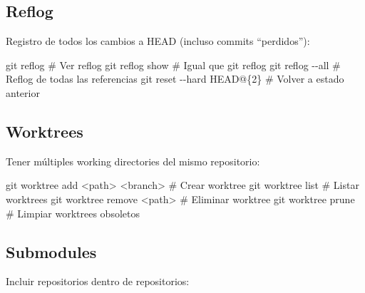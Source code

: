 \documentclass[
  doc,
  floatsintext,
  longtable,
  a4paper,
  nolmodern,
  notxfonts,
  notimes,
  12pt,
  colorlinks=true,linkcolor=blue,citecolor=blue,urlcolor=blue]{apa7}
\newenvironment{Shaded}{\begin{snugshade}}{\end{snugshade}}
\newcommand{\AttributeTok}[1]{\textcolor[rgb]{0.40,0.45,0.13}{#1}}
\newcommand{\CommentTok}[1]{\textcolor[rgb]{0.37,0.37,0.37}{#1}}
\newcommand{\FunctionTok}[1]{\textcolor[rgb]{0.28,0.35,0.67}{#1}}
\newcommand{\NormalTok}[1]{\textcolor[rgb]{0.00,0.23,0.31}{#1}}
\newcommand{\OperatorTok}[1]{\textcolor[rgb]{0.37,0.37,0.37}{#1}}
\begin{document}
\subsection{Reflog}\label{reflog}

Registro de todos los cambios a HEAD (incluso commits ``perdidos''):

\begin{Shaded}
\begin{Highlighting}[]
\FunctionTok{git}\NormalTok{ reflog                 }\CommentTok{\# Ver reflog}
\FunctionTok{git}\NormalTok{ reflog show            }\CommentTok{\# Igual que git reflog}
\FunctionTok{git}\NormalTok{ reflog }\AttributeTok{{-}{-}all}           \CommentTok{\# Reflog de todas las referencias}
\FunctionTok{git}\NormalTok{ reset }\AttributeTok{{-}{-}hard}\NormalTok{ HEAD@\{2\}  }\CommentTok{\# Volver a estado anterior}
\end{Highlighting}
\end{Shaded}

\subsection{Worktrees}\label{worktrees}

Tener múltiples working directories del mismo repositorio:

\begin{Shaded}
\begin{Highlighting}[]
\FunctionTok{git}\NormalTok{ worktree add }\OperatorTok{\textless{}}\NormalTok{path}\OperatorTok{\textgreater{}} \OperatorTok{\textless{}}\NormalTok{branch}\OperatorTok{\textgreater{}}  \CommentTok{\# Crear worktree}
\FunctionTok{git}\NormalTok{ worktree list          }\CommentTok{\# Listar worktrees}
\FunctionTok{git}\NormalTok{ worktree remove }\OperatorTok{\textless{}}\NormalTok{path}\OperatorTok{\textgreater{}} \CommentTok{\# Eliminar worktree}
\FunctionTok{git}\NormalTok{ worktree prune         }\CommentTok{\# Limpiar worktrees obsoletos}
\end{Highlighting}
\end{Shaded}

\subsection{Submodules}\label{submodules}

Incluir repositorios dentro de repositorios:
\end{document}
